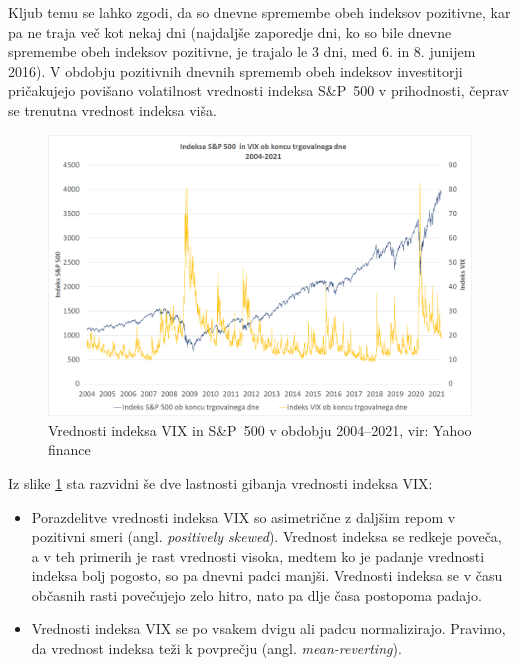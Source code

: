 \documentclass[12pt,a4paper, reqno]{amsart}
\theoremstyle{definition} %
\theoremstyle{plain} %
\begin{document}
Kljub temu se lahko zgodi, da so dnevne spremembe obeh indeksov pozitivne, kar pa ne traja več kot nekaj dni (najdaljše zaporedje dni, ko so bile dnevne spremembe obeh indeksov pozitivne, je trajalo le 3 dni, med 6. in 8. junijem 2016). V obdobju pozitivnih dnevnih sprememb obeh indeksov investitorji pričakujejo povišano volatilnost vrednosti indeksa S\&P~500 v prihodnosti, čeprav se trenutna vrednost indeksa viša. \\

\begin{figure}[!h]
\centering
\includegraphics[width = 15 cm]{Grafi/VIX_vs_SPX_2004-2021.png}
\caption{Vrednosti indeksa VIX in S\&P~500 v obdobju 2004--2021, vir: Yahoo finance}
\label{Graf 2}
\end{figure}


Iz slike \ref{Graf 2} sta razvidni še dve lastnosti gibanja vrednosti indeksa VIX:
\begin{itemize}
\item Porazdelitve vrednosti indeksa VIX so asimetrične z daljšim repom v pozitivni smeri (angl. \textit{positively skewed}). Vrednost indeksa se redkeje poveča, a v teh primerih je rast vrednosti visoka, medtem ko je padanje vrednosti indeksa bolj pogosto, so pa dnevni padci manjši. Vrednosti indeksa se v času občasnih rasti povečujejo zelo hitro, nato pa dlje časa postopoma padajo.\\

\item Vrednosti indeksa VIX se po vsakem dvigu ali padcu normalizirajo. Pravimo, da vrednost indeksa teži k povprečju (angl. \textit{mean-reverting}).
\end{itemize}
\end{document}
